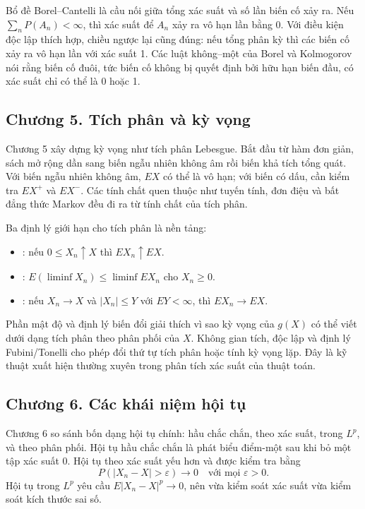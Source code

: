 \documentclass[11pt]{article}
\begin{document}
Bổ đề Borel--Cantelli là cầu nối giữa tổng xác suất và số lần biến cố xảy ra.
Nếu \(\sum_n P(A_n)<\infty\), thì xác suất để \(A_n\) xảy ra vô hạn lần bằng
0. Với điều kiện độc lập thích hợp, chiều ngược lại cũng đúng: nếu tổng phân kỳ
thì các biến cố xảy ra vô hạn lần với xác suất 1. Các luật không--một của Borel
và Kolmogorov nói rằng biến cố đuôi, tức biến cố không bị quyết định bởi hữu
hạn biến đầu, có xác suất chỉ có thể là 0 hoặc 1.

\subsection*{Chương 5. Tích phân và kỳ vọng}

Chương 5 xây dựng kỳ vọng như tích phân Lebesgue. Bắt đầu từ hàm đơn giản,
sách mở rộng dần sang biến ngẫu nhiên không âm rồi biến khả tích tổng quát.
Với biến ngẫu nhiên không âm, \(E X\) có thể là vô hạn; với biến có dấu, cần
kiểm tra \(E X^+\) và \(E X^-\). Các tính chất quen thuộc như tuyến tính, đơn
điệu và bất đẳng thức Markov đều đi ra từ tính chất của tích phân.

Ba định lý giới hạn cho tích phân là nền tảng:
\begin{itemize}
  \item {}: nếu \(0\le X_n\uparrow X\) thì
        \(E X_n\uparrow E X\).
  \item {}: \(E(\liminf X_n)\le \liminf E X_n\) cho \(X_n\ge0\).
  \item {}: nếu \(X_n\to X\) và \(|X_n|\le Y\) với
        \(E Y<\infty\), thì \(E X_n\to E X\).
\end{itemize}

Phần mật độ và định lý biến đổi giải thích vì sao kỳ vọng của \(g(X)\) có thể
viết dưới dạng tích phân theo phân phối của \(X\). Không gian tích, độc lập và
định lý Fubini/Tonelli cho phép đổi thứ tự tích phân hoặc tính kỳ vọng lặp. Đây
là kỹ thuật xuất hiện thường xuyên trong phân tích xác suất của thuật toán.

\subsection*{Chương 6. Các khái niệm hội tụ}

Chương 6 so sánh bốn dạng hội tụ chính: hầu chắc chắn, theo xác suất, trong
\(L^p\), và theo phân phối. Hội tụ hầu chắc chắn là phát biểu điểm-một sau khi
bỏ một tập xác suất 0. Hội tụ theo xác suất yếu hơn và được kiểm tra bằng
\[
  P(|X_n-X|>\varepsilon)\to0\quad \text{với mọi }\varepsilon>0.
\]
Hội tụ trong \(L^p\) yêu cầu \(E|X_n-X|^p\to0\), nên vừa kiểm soát xác suất
vừa kiểm soát kích thước sai số.
\end{document}
